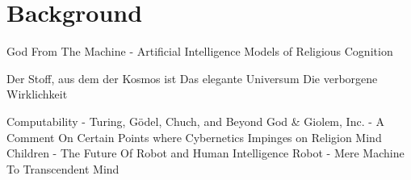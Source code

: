 \section{Background}

God From The Machine - Artificial Intelligence Models of Religious Cognition

Der Stoff, aus dem der Kosmos ist
Das elegante Universum
Die verborgene Wirklichkeit

Computability - Turing, Gödel, Chuch, and Beyond
God \& Giolem, Inc. - A Comment On Certain Points where Cybernetics Impinges on Religion
Mind Children - The Future Of Robot and Human Intelligence
Robot - Mere Machine To Transcendent Mind